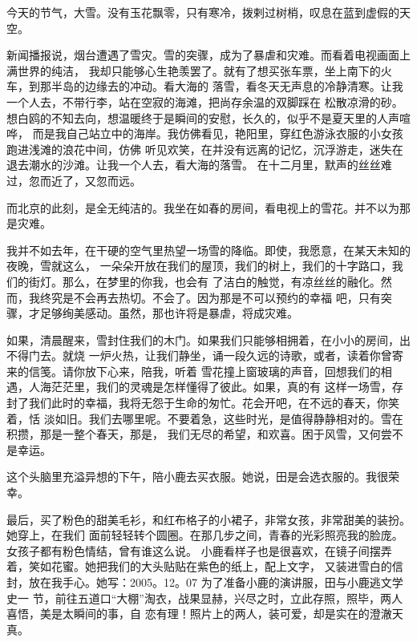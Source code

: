 	\endwriting



		今天的节气，大雪。没有玉花飘零，只有寒冷，拨剌过树梢，叹息在蓝到虚假的天空。


		新闻播报说，烟台遭遇了雪灾。雪的突骤，成为了暴虐和灾难。而看着电视画面上满世界的纯洁，
	我却只能够心生艳羡罢了。就有了想买张车票，坐上南下的火车，到那半岛的边缘去的冲动。看大海的
	落雪，看冬天无声息的冷静清寒。让我一个人去，不带行李，站在空寂的海滩，把尚存余温的双脚踩在
	松散凉滑的砂。想白鸥的不知去向，想温暖终于是瞬间的安慰，长久的，似乎不是夏天里的人声喧哗，
	而是我自己站立中的海岸。我仿佛看见，艳阳里，穿红色游泳衣服的小女孩跑进浅滩的浪花中间，仿佛
	听见欢笑，在并没有远离的记忆，沉浮游走，迷失在退去潮水的沙滩。让我一个人去，看大海的落雪。
	在十二月里，默声的丝丝难过，忽而近了，又忽而远。


		而北京的此刻，是全无纯洁的。我坐在如春的房间，看电视上的雪花。并不以为那是灾难。

		我并不如去年，在干硬的空气里热望一场雪的降临。即使，我愿意，在某天未知的夜晚，雪就这么，
	一朵朵开放在我们的屋顶，我们的树上，我们的十字路口，我们的街灯。那么，在梦里的你我，也会有
	了洁白的触觉，有凉丝丝的融化。然而，我终究是不会再去热切。不会了。因为那是不可以预约的幸福
	吧，只有突骤，才足够绚美感动。虽然，那也许将是暴虐，将成灾难。


		如果，清晨醒来，雪封住我们的木门。如果我们只能够相拥着，在小小的房间，出不得门去。就烧
	一炉火热，让我们静坐，诵一段久远的诗歌，或者，读着你曾寄来的信笺。请你放下心来，陪我，听着
	雪花撞上窗玻璃的声音，回想我们的相遇，人海茫茫里，我们的灵魂是怎样懂得了彼此。如果，真的有
	这样一场雪，存封了我们此时的幸福，我将无怨于生命的匆忙。花会开吧，在不远的春天，你笑着，恬
	淡如旧。我们去哪里呢。不要着急，这些时光，是值得静静相对的。雪在积攒，那是一整个春天，那是，
	我们无尽的希望，和欢喜。困于风雪，又何尝不是幸运。


		这个头脑里充溢异想的下午，陪小鹿去买衣服。她说，田是会选衣服的。我很荣幸。

		最后，买了粉色的甜美毛衫，和红布格子的小裙子，非常女孩，非常甜美的装扮。她穿上，在我们
	面前轻轻转个圆圈。在那几步之间，青春的光彩照亮我的脸庞。女孩子都有粉色情结，曾有谁这么说。
	小鹿看样子也是很喜欢，在镜子间摆弄着，笑如花蜜。她把我们的大头贴贴在紫色的纸上，配上文字，
	又装进雪白的信封，放在我手心。她写：2005。12。07 为了准备小鹿的演讲服，田与小鹿逃文学史一
	节，前往五道口“大棚”淘衣，战果显赫，兴尽之时，立此存照，照毕，两人喜悟，美是太瞬间的事，自
	恋有理！照片上的两人，装可爱，却是实在的澄澈天真。


